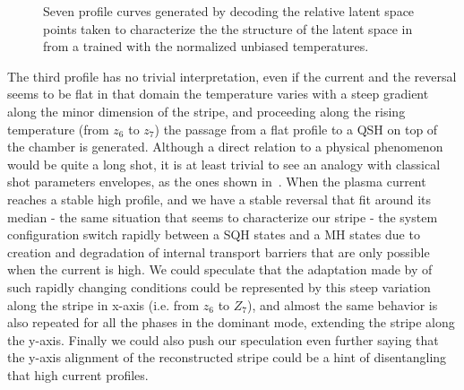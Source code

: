\begin{figure}
    \caption{Seven profile curves generated by decoding the relative latent space points taken to characterize the the structure of the latent space in~\Figure{\ref{fig:VAE2_qsh_ls_preconditioned}} from a  trained with the normalized unbiased temperatures. }
    \label{fig:VAE2_qsh_gen_prec}
\end{figure}
The third profile has no trivial interpretation, even if the current and the reversal seems to be flat in that domain the temperature varies with a steep gradient along the minor dimension of the stripe, and proceeding along the rising temperature (from $z_6$ to $z_7$) the passage from a flat profile to a QSH on top of the chamber is generated.
Although a direct relation to a physical phenomenon would be quite a long shot, it is at least trivial to see an analogy with classical \RFXmod shot parameters envelopes, as the ones shown in~\Figure{\ref{fig:rfx_shot_22069}}. When the plasma current reaches a stable high profile, and we have a stable reversal that fit around its median - the same situation that seems to characterize our stripe - the system configuration switch rapidly between a SQH states and a MH states due to creation and degradation of internal transport barriers that are only possible when the current is high. We could speculate that the adaptation made by  of such rapidly changing conditions could be represented by this steep variation along the stripe in x-axis (i.e. from $z_6$ to $Z_7$), and almost the same behavior is also repeated for all the phases in the dominant mode, extending the stripe along the y-axis.
Finally we could also push our speculation even further saying that the y-axis alignment of the reconstructed stripe could be a hint of disentangling that high current profiles.


                                                      

